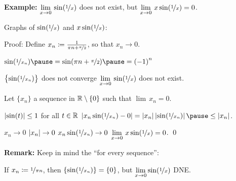 \documentclass[10pt,aspectratio=149]{beamer}
\begin{document}
\begin{frame}

\textbf{Example:}
$\displaystyle \lim_{x \to 0} \, \sin( \nicefrac{1}{x} )$
does not exist, but 
$\displaystyle \lim_{x \to 0} \, x\sin( \nicefrac{1}{x} ) = 0$.

\pause
\medskip

Graphs of $\sin(\nicefrac{1}{x})$ and $x \sin(\nicefrac{1}{x})$:

\medskip


\pause
\medskip

Proof:
Define
$x_n \coloneqq \frac{1}{\pi n + \nicefrac{\pi}{2}}$, so that $x_n \to 0$.

\pause
\thus \quad $\sin ( \nicefrac{1}{x_n} )
\pause
=
\sin (\pi n + \nicefrac{\pi}{2})
\pause
= {(-1)}^n$

\pause
\thus \quad $\bigl\{ \sin ( \nicefrac{1}{x_n} ) \bigr\}$ does not converge
\pause
\wthus
$\displaystyle \lim_{x \to 0} \, \sin( \nicefrac{1}{x} )$ does not exist.

\pause
\medskip

Let $\{ x_n \}$ a sequence in ${\mathbb{R}} \setminus \{ 0 \}$ such that $\lim\, x_n = 0$.

\pause
$\left\lvert {\sin(t)} \right\rvert \leq 1$ for all $t \in {\mathbb{R}}$
\pause
\quad \thus \quad
$
\abs{x_n\sin(\nicefrac{1}{x_n})-0}
=
\abs{x_n}\abs{\sin(\nicefrac{1}{x_n})}
\pause
\leq
\abs{x_n}$.

\pause
\medskip

$x_n \to 0$
\pause
\wthus
$\left\lvert {x_n} \right\rvert \to 0$
\pause
\wthus
$x_n\sin(\nicefrac{1}{x_n}) \to 0$
\pause
\wthus
$\displaystyle \lim_{x \to 0} \, x\sin( \nicefrac{1}{x} ) = 0$.
\qed

\pause
\medskip

\textbf{Remark:} Keep
in mind the ``for every sequence'':

\pause
If $x_n \coloneqq \nicefrac{1}{\pi n}$, then
$\{ \sin (\nicefrac{1}{x_n}) \} = \{ 0 \}$, but $\displaystyle \lim_{x\to 0}
\sin(\nicefrac{1}{x})$ DNE.
\end{frame}
\end{document}
